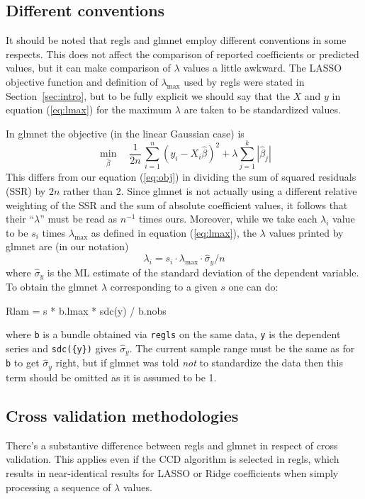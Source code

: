 \documentclass{article}
\begin{document}
\subsection*{Different conventions}

It should be noted that \textsf{regls} and \textsf{glmnet} employ
different conventions in some respects. This does not affect the
comparison of reported coefficients or predicted values, but it can
make comparison of $\lambda$ values a little awkward. The LASSO
objective function and definition of $\lambda_{\max}$ used by
\textsf{regls} were stated in Section~\ref{sec:intro}, but to be fully
explicit we should say that the $X$ and $y$ in equation
(\ref{eq:lmax}) for the maximum $\lambda$ are taken to be standardized
values.

In \textsf{glmnet} the objective (in the linear Gaussian case) is
\[
   \min_{\hat{\beta}} \quad \frac{1}{2n}\,
  \sum_{i=1}^n (y_i - X_i\hat{\beta})^2 + \lambda \sum_{j=1}^k |\hat{\beta}_j|
\]
This differs from our equation (\ref{eq:obj}) in dividing the sum of
squared residuals (SSR) by $2n$ rather than 2. Since \textsf{glmnet}
is not actually using a different relative weighting of the SSR and
the sum of absolute coefficient values, it follows that their
``$\lambda$'' must be read as $n^{-1}$ times ours. Moreover, while we
take each $\lambda_i$ value to be $s_i$ times $\lambda_{\max}$ as
defined in equation (\ref{eq:lmax}), the $\lambda$ values printed by
\textsf{glmnet} are (in our notation)
\[
\lambda_i = s_i \cdot \lambda_{\max} \cdot \hat{\sigma}_y / n
\]
where $\hat{\sigma}_y$ is the ML estimate of the standard deviation of
the dependent variable. To obtain the \textsf{glmnet} $\lambda$
corresponding to a given $s$ one can do:
\begin{code}
Rlam = s * b.lmax * sdc({y}) / b.nobs
\end{code}
where \texttt{b} is a bundle obtained via \texttt{regls} on the same
data, \texttt{y} is the dependent series and \texttt{sdc(\{y\})} gives
$\hat{\sigma}_y$. The current sample range must be the same as for
\texttt{b} to get $\hat{\sigma}_y$ right, but if \textsf{glmnet} was
told \textit{not} to standardize the data then this term should be
omitted as it is assumed to be 1.

\subsection*{Cross validation methodologies}

There's a substantive difference between \textsf{regls} and
\textsf{glmnet} in respect of cross validation. This applies even if
the CCD algorithm is selected in \textsf{regls}, which results in
near-identical results for LASSO or Ridge coefficients when simply
processing a sequence of $\lambda$ values.
\end{document}
